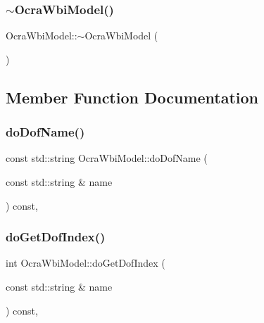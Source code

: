 \subsubsection{\texorpdfstring{$\sim$\+Ocra\+Wbi\+Model()}{~OcraWbiModel()}}
{\footnotesize\ttfamily Ocra\+Wbi\+Model\+::$\sim$\+Ocra\+Wbi\+Model (\begin{DoxyParamCaption}{ }\end{DoxyParamCaption})\hspace{0.3cm}{\ttfamily [virtual]}}



\subsection{Member Function Documentation}
\hypertarget{classocra__icub_1_1OcraWbiModel_af65d4fd7cae0ed86ea2bb588a9e024f9}{}\label{classocra__icub_1_1OcraWbiModel_af65d4fd7cae0ed86ea2bb588a9e024f9} 
\subsubsection{\texorpdfstring{do\+Dof\+Name()}{doDofName()}}
{\footnotesize\ttfamily const std\+::string Ocra\+Wbi\+Model\+::do\+Dof\+Name (\begin{DoxyParamCaption}\item[{const std\+::string \&}]{name }\end{DoxyParamCaption}) const\hspace{0.3cm}{\ttfamily [protected]}, {\ttfamily [virtual]}}

\hypertarget{classocra__icub_1_1OcraWbiModel_a327862ec0da18711147d0ec62002fbef}{}\label{classocra__icub_1_1OcraWbiModel_a327862ec0da18711147d0ec62002fbef} 
\subsubsection{\texorpdfstring{do\+Get\+Dof\+Index()}{doGetDofIndex()}}
{\footnotesize\ttfamily int Ocra\+Wbi\+Model\+::do\+Get\+Dof\+Index (\begin{DoxyParamCaption}\item[{const std\+::string \&}]{name }\end{DoxyParamCaption}) const\hspace{0.3cm}{\ttfamily [protected]}, {\ttfamily [virtual]}}

